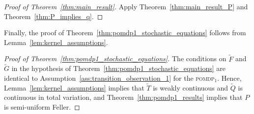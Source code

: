 \documentclass[11pt,onecolumn]{IEEEtran}  %
\newcommand{\pomdp}{\textsc{pomdp}}
\newcommand{\pomdpOne}{\pomdp{}${}_{1}$}
\theoremstyle{definition}
\begin{document}
\begin{proof}[Proof of Theorem~\ref{thm:main_result}]
    Apply Theorem~\ref{thm:main_result_P} and Theorem~\ref{thm:P_implies_q}.    
\end{proof}

Finally, the proof of Theorem~\ref{thm:pomdp1_stochastic_equations} follows from Lemma~\ref{lem:kernel_assumptions}.

\begin{proof}[{Proof of Theorem~\ref{thm:pomdp1_stochastic_equations}}]
    The conditions on $\tilde{F}$ and $\tilde{G}$ in the hypothesis of Theorem~\ref{thm:pomdp1_stochastic_equations} are identical to Assumption~\ref{ass:transition_observation_1} for the \pomdpOne{}. Hence, Lemma~\ref{lem:kernel_assumptions} implies that $\tilde{T}$ is weakly continuous and $\tilde{Q}$ is continuous in total variation, and Theorem~\ref{thm:pomdp1_results} implies that $P$ is semi-uniform Feller. 
\end{proof}



\end{document}
